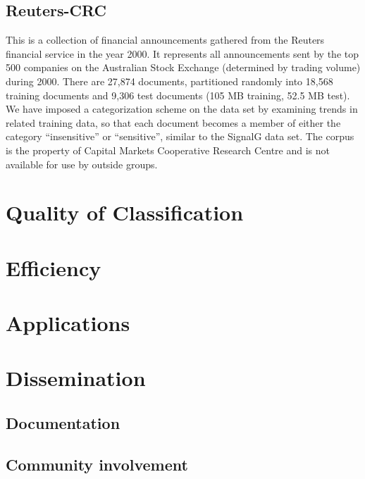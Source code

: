 \subsection{Reuters-CRC}
This is a collection of financial announcements gathered from the
Reuters financial service in the year 2000.  It represents all
announcements sent by the top 500 companies on the Australian Stock
Exchange (determined by trading volume) during 2000.  There are 27,874
documents, partitioned randomly into 18,568 training documents and
9,306 test documents (105 MB training, 52.5 MB test).  We have imposed
a categorization scheme on the data set by examining trends in related
training data, so that each document becomes a member of either the
category ``insensitive'' or ``sensitive'', similar to the SignalG data
set.  The corpus is the property of Capital Markets Cooperative
Research Centre and is not available for use by outside groups.


\section{Quality of Classification}
\section{Efficiency}

\section{Applications}


\section{Dissemination}
\subsection{Documentation}
\subsection{Community involvement}
